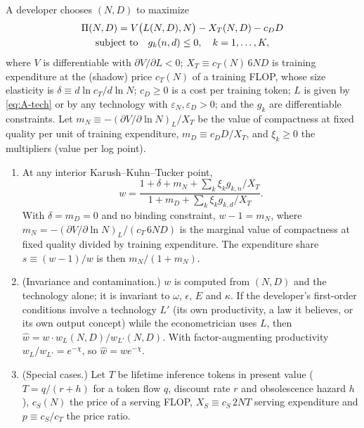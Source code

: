 \begin{proposition}\label{prop:A-wedge}
A developer chooses $(N,D)$ to maximize
\begin{equation}\label{eq:A-gw-obj}
\begin{gathered}
\Pi(N,D)=V\big(L(N,D),N\big)-X_T(N,D)-c_DD\\
\textup{subject to}\quad g_k(n,d)\le0,\quad k=1,\dots,K,
\end{gathered}
\end{equation}
where $V$ is differentiable with $\partial V/\partial L<0$; $X_T\equiv c_T(N)\,6ND$ is training expenditure at the
(shadow) price $c_T(N)$ of a training FLOP, whose size elasticity is $\delta\equiv d\ln c_T/d\ln N$; $c_D\ge0$ is a cost
per training token; $L$ is given by \eqref{eq:A-tech} or by any technology with $\varepsilon_N,\varepsilon_D>0$; and the
$g_k$ are differentiable constraints. Let $m_N\equiv-(\partial V/\partial\ln N)_L/X_T$ be the value of compactness at
fixed quality per unit of training expenditure, $m_D\equiv c_DD/X_T$, and $\xi_k\ge0$ the multipliers (value per log
point).
\begin{enumerate}
\item[(i)] At any interior Karush--Kuhn--Tucker point,
\begin{equation}\label{eq:A-gw}
w=\frac{1+\delta+m_N+\sum_k\xi_kg_{k,n}/X_T}{1+m_D+\sum_k\xi_kg_{k,d}/X_T}.
\end{equation}
With $\delta=m_D=0$ and no binding constraint, $w-1=m_N$, where $m_N=-(\partial V/\partial\ln N)_L/(c_T\,6ND)$
is the marginal value of compactness at fixed quality divided by training expenditure. The expenditure share
$s\equiv(w-1)/w$ is then $m_N/(1+m_N)$.
\item[(ii)] (Invariance and contamination.) $w$ is computed from $(N,D)$ and the technology alone; it is invariant to
$\omega$, $\epsilon$, $E$ and $\kappa$. If the developer's first-order conditions involve a technology $L'$ (its own
productivity, a law it believes, or its own output concept) while the econometrician uses $L$, then
$\hat w=w\cdot w_L(N,D)/w_{L'}(N,D)$. With factor-augmenting productivity $w_L/w_{L'}=e^{-\chi}$, so $\hat w=we^{-\chi}$.
\item[(iii)] (Special cases.) Let $T$ be lifetime inference tokens in present value ($T=q/(r+h)$ for a token flow $q$,
discount rate $r$ and obsolescence hazard $h$), $c_S(N)$ the price of a serving FLOP, $X_S\equiv c_S\,2NT$ serving
expenditure and $p\equiv c_S/c_T$ the price ratio.

\end{enumerate}
\end{proposition}
